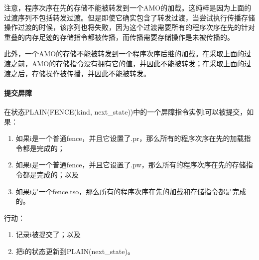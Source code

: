 \begin{commentary}
  注意，程序次序在先的存储不能被转发到一个AMO的加载。这纯粹是因为上面的过渡序列不包括转发过渡。但是即使它确实包含了转发过渡，当尝试执行传播存储操作过渡的时候，该序列也将失败，因为这个过渡需要所有的程序次序在先的针对重叠的内存足迹的存储指令都被传播，而传播需要存储操作是未被传播的。

此外，一个AMO的存储不能被转发到一个程序次序后继的加载。在采取上面的过渡之前，AMO的存储指令没有拥有它的值，并因此不能被转发；在采取上面的过渡之后，存储操作被传播，并因此不能被转发。
\end{commentary}


\paragraph{提交屏障}\label{omm:commit_fence}
在状态PLAIN(FENCE(kind, next_state))中的一个屏障指令实例i可以被提交，如果：
\begin{enumerate}
\item 如果i是一个普通fence，并且它设置了.pr，那么所有的程序次序在先的加载指令都是完成的； %
\item 如果i是一个普通fence，并且它设置了.pw，那么所有的程序次序在先的存储指令都是完成的；以及 %
\item 如果i是一个fence.tso，那么所有的程序次序在先的加载和存储指令都是完成的。 %
\end{enumerate}
行动：
\begin{enumerate}
\item 记录i被提交了；以及 %
\item 把i的状态更新到PLAIN(next_state)。 %
\end{enumerate}


